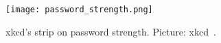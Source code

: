 \begin{frame}
  \begin{figure}
    \texttt{[image: password\_strength.png]}
    \caption{xkcd's strip on password strength.
    Picture: xkcd~\cite{xkcd936}.}
  \end{figure}
\end{frame}

%
%
%
%
%
%
%

